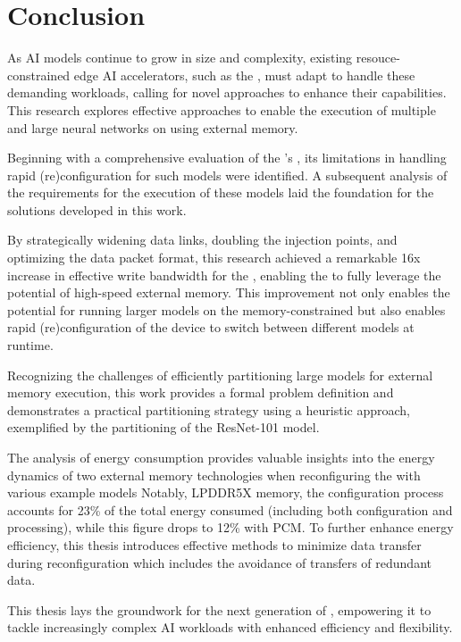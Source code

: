 \section{Conclusion}
As AI models continue to grow in size and complexity, existing resouce-constrained edge AI accelerators, such as the \graicore{}, must adapt to handle these demanding workloads, calling for novel approaches to enhance their capabilities.
This research explores effective approaches to enable the execution of multiple and large neural networks on \graicore{} using external memory.

Beginning with a comprehensive evaluation of the \graicore{}'s \confignoc{}, its limitations in handling rapid (re)configuration for such models were identified.
A subsequent analysis of the requirements for the execution of these models laid the foundation for the solutions developed in this work.

By strategically widening data links, doubling the injection points, and optimizing the data packet format, this research achieved a remarkable 16x increase in effective write bandwidth for the \confignoc{}, enabling the \graicore{} to fully leverage the potential of high-speed external memory.
This improvement not only enables the potential for running larger models on the memory-constrained \graicore{} but also enables rapid (re)configuration of the device to switch between different models at runtime.

Recognizing the challenges of efficiently partitioning large models for external memory execution, this work provides a formal problem definition and demonstrates a practical partitioning strategy using a heuristic approach, exemplified by the partitioning of the ResNet-101 model.

The analysis of energy consumption provides valuable insights into the energy dynamics of two external memory technologies when reconfiguring the \graicore{} with various example models
Notably, LPDDR5X memory, the configuration process accounts for 23\% of the total energy consumed (including both configuration and processing), while this figure drops to 12\% with PCM.
To further enhance energy efficiency, this thesis introduces effective methods to minimize data transfer during reconfiguration which includes the avoidance of transfers of redundant data.

This thesis lays the groundwork for the next generation of \graicore{}, empowering it to tackle increasingly complex AI workloads with enhanced efficiency and flexibility.
